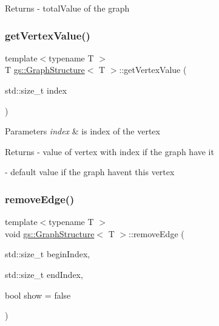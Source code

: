 \begin{DoxyReturn}{Returns}
-\/ total\+Value of the graph 
\end{DoxyReturn}
\mbox{\label{classgs_1_1_graph_structure_a0adafe2cbe3eb635da12957b9b0ad803}} 
\subsubsection{\texorpdfstring{get\+Vertex\+Value()}{getVertexValue()}}
{\footnotesize\ttfamily template$<$typename T $>$ \\
T \mbox{\hyperlink{classgs_1_1_graph_structure}{gs\+::\+Graph\+Structure}}$<$ T $>$\+::get\+Vertex\+Value (\begin{DoxyParamCaption}\item[{std\+::size\+\_\+t}]{index }\end{DoxyParamCaption})}


\begin{DoxyParams}{Parameters}
{\em index} & is index of the vertex \\
\hline
\end{DoxyParams}
\begin{DoxyReturn}{Returns}
-\/ value of vertex with \textquotesingle{}index\textquotesingle{} if the graph have it 

-\/ default value if the graph haven\textquotesingle{}t this vertex 
\end{DoxyReturn}
\mbox{\label{classgs_1_1_graph_structure_aa27a2bd0421823f44ac670b691cedcbd}} 
\subsubsection{\texorpdfstring{remove\+Edge()}{removeEdge()}}
{\footnotesize\ttfamily template$<$typename T $>$ \\
void \mbox{\hyperlink{classgs_1_1_graph_structure}{gs\+::\+Graph\+Structure}}$<$ T $>$\+::remove\+Edge (\begin{DoxyParamCaption}\item[{std\+::size\+\_\+t}]{begin\+Index,  }\item[{std\+::size\+\_\+t}]{end\+Index,  }\item[{bool}]{show = {\ttfamily false} }\end{DoxyParamCaption})}




